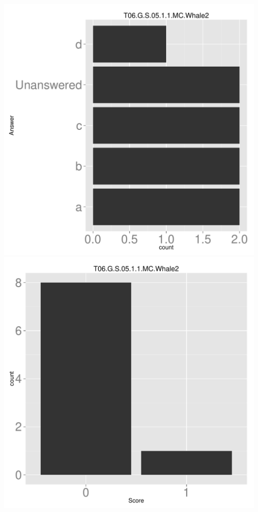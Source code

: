 \documentclass[12pt,english,nohyper]{tufte-handout}\usepackage[]{graphicx}\usepackage[]{color}
\begin{document}
\begin{center} \includegraphics[width=.45\linewidth]{Topic06_AB_78_answer} \includegraphics[width=.45\linewidth]{Topic06_AB_78_score} \end{center} 
\end{document}
